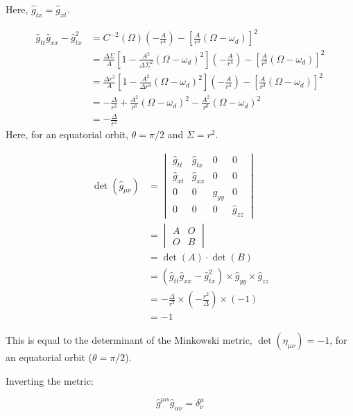 \documentclass[english]{article}
\begin{document}
Here, $\hat{g}_{tx}=\hat{g}_{xt}$.

\begin{align*}
\hat{g}_{tt}\hat{g}_{xx}-\hat{g}^{2}_{tx} & =C^{-2}\left(\Omega\right)\left(-\frac{A}{r^{4}}\right)-\left[\frac{A}{r^{3}}\left(\Omega-\omega_{d}\right)\right]^{2}\\
 & =\frac{\Delta\Sigma}{A}\left[1-\frac{A^{2}}{\Delta\Sigma^{2}}\left(\Omega-\omega_{d}\right)^{2}\right]\left(-\frac{A}{r^{4}}\right)-\left[\frac{A}{r^{3}}\left(\Omega-\omega_{d}\right)\right]^{2}\\
 & =\frac{\Delta r^{2}}{A}\left[1-\frac{A^{2}}{\Delta r^{4}}\left(\Omega-\omega_{d}\right)^{2}\right]\left(-\frac{A}{r^{4}}\right)-\left[\frac{A}{r^{3}}\left(\Omega-\omega_{d}\right)\right]^{2}\\
 & =-\frac{\Delta}{r^{2}}+\frac{A^{2}}{r^{6}}\left(\Omega-\omega_{d}\right)^{2}-\frac{A^{2}}{r^{6}}\left(\Omega-\omega_{d}\right)^{2}\\
 & =-\frac{\Delta}{r^{2}}
\end{align*}
 Here, for an equatorial orbit, $\theta=\pi/2$ and $\Sigma=r^{2}$.

\begin{align*}
\det\left(\hat{g}_{\mu\nu}\right) & =\begin{vmatrix}\hat{g}_{tt} & \hat{g}_{tx} & 0 & 0\\
\hat{g}_{xt} & \hat{g}_{xx} & 0 & 0\\
0 & 0 & \hat{g}_{yy} & 0\\
0 & 0 & 0 & \hat{g}_{zz}
\end{vmatrix}\\
 & =\begin{vmatrix}A & O\\
O & B
\end{vmatrix}\\
 & =\det\left(A\right)\cdot\det\left(B\right)\\
 & =\left(\hat{g}_{tt}\hat{g}_{xx}-\hat{g}^{2}_{tx}\right)\times\hat{g}_{yy}\times\hat{g}_{zz}\\
 & =-\frac{\Delta}{r^{2}}\times\left(-\frac{r^{2}}{\Delta}\right)\times\left(-1\right)\\
 & =-1
\end{align*}

This is equal to the determinant of the Minkowski metric, $\det\left(\eta_{\mu\nu}\right)=-1$,
for an equatorial orbit ($\theta=\pi/2$).

Inverting the metric:

\[
\hat{g}^{\mu\alpha}\hat{g}_{\alpha\nu}=\delta^{\mu}_{\!\nu}
\]
\end{document}
